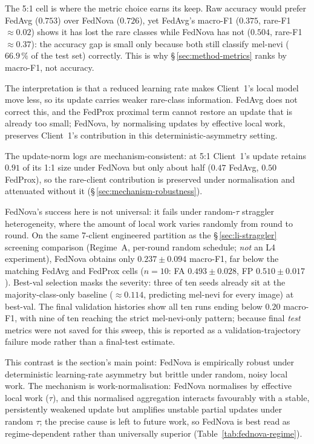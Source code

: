 \documentclass[11pt,a4paper]{report}
\begin{document}
The 5:1 cell is where the metric choice earns its keep. Raw accuracy would prefer
FedAvg ($0.753$) over FedNova ($0.726$), yet FedAvg's macro-F1 ($0.375$, rare-F1
$\approx 0.02$) shows it has lost the rare classes while FedNova has not ($0.504$,
rare-F1 $\approx 0.37$): the accuracy gap is small only because both still classify
mel-nevi ($66.9\,\%$ of the test set) correctly. This is why
\S\,\ref{sec:method-metrics} ranks by macro-F1, not accuracy.

The interpretation is that a reduced learning rate makes Client~1's local model
move less, so its update carries weaker rare-class information. FedAvg does not
correct this, and the FedProx proximal term cannot restore an update that is
already too small; FedNova, by normalising updates by effective local work,
preserves Client~1's contribution in this deterministic-asymmetry setting.

The update-norm logs are mechanism-consistent: at 5:1 Client~1's update retains
$0.91$ of its 1:1 size under FedNova but only about half ($0.47$ FedAvg, $0.50$
FedProx), so the rare-client contribution is preserved under normalisation and
attenuated without it (\S\,\ref{sec:mechanism-robustness}).

FedNova's success here is not universal: it fails under random-$\tau$ straggler
heterogeneity, where the amount of local work varies randomly from round to
round. On the same 7-client engineered partition as the
\S\,\ref{sec:li-straggler} screening comparison (Regime~A, per-round random
schedule; \emph{not} an L4 experiment), FedNova obtains only
$0.237 \pm 0.094$ macro-F1, far below the matching FedAvg and FedProx cells
($n = 10$: FA $0.493 \pm 0.028$, FP $0.510 \pm 0.017$). Best-val selection masks
the severity: three of ten seeds already sit at the majority-class-only baseline
($\approx 0.114$, predicting mel-nevi for every image) at best-val. The final
validation histories show all ten runs ending below $0.20$ macro-F1, with nine of
ten reaching the strict mel-nevi-only pattern; because final \emph{test} metrics
were not saved for this sweep, this is reported as a validation-trajectory failure
mode rather than a final-test estimate.

This contrast is the section's main point: FedNova is empirically robust under
deterministic learning-rate asymmetry but brittle under random, noisy local work.
The mechanism is work-normalisation: FedNova normalises by effective
local work ($\tau$), and this normalised aggregation interacts favourably with a
stable, persistently weakened update but amplifies unstable partial updates under
random $\tau$; the precise cause is left
to future work, so FedNova is best read as regime-dependent rather than universally
superior (Table~\ref{tab:fednova-regime}).
\end{document}
